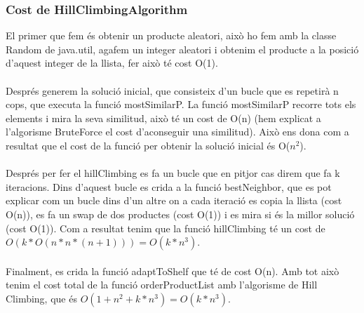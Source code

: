 \documentclass[a4paper, t]{article}
\begin{document}
\subsubsection{Cost de HillClimbingAlgorithm}
El primer que fem és obtenir un producte aleatori, això ho fem amb la classe Random de java.util, agafem un integer aleatori i obtenim el producte a la posició d’aquest integer de la llista, fer això té cost O(1).
\\ \\
Després generem la solució inicial, que consisteix d’un bucle que es repetirà n cops, que executa la funció mostSimilarP. La funció mostSimilarP recorre tots els elements i mira la seva similitud, això té un cost de O(n) (hem explicat a l'algorisme BruteForce el cost d’aconseguir una similitud). Això ens dona com a resultat que el cost de la funció per obtenir la 
solució inicial és O($n^2$).
\\ \\
Després per fer el hillClimbing es fa un bucle que en pitjor cas direm que fa k iteracions. Dins d’aquest bucle es crida a la funció bestNeighbor, que es pot explicar com un bucle dins d’un altre on a cada iteració es copia la llista (cost O(n)), es fa un swap de dos productes (cost O(1)) i es mira si és la millor solució (cost O(1)). Com a resultat tenim que la funció hillClimbing té un cost de $O(k*O(n*n*(n+1))) = O(k*n^3)$.
\\ \\
 Finalment, es crida la funció adaptToShelf que té de cost O(n). Amb tot això tenim el cost total de la funció orderProductList amb l’algorisme de Hill Climbing, que és $O(1+n^2+k*n^3) = O(k*n^3)$.

\newpage
\end{document}
